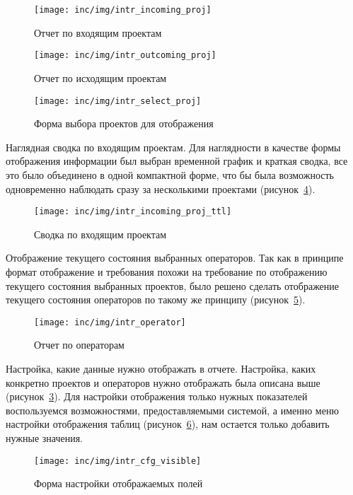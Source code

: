 \begin{figure}[ht]
    \centering
    \texttt{[image: inc/img/intr\_incoming\_proj]}
    \caption{Отчет по входящим проектам}
    \label{pic:intr:proj:incoming}
\end{figure}

\begin{figure}[ht]
    \centering
    \texttt{[image: inc/img/intr\_outcoming\_proj]}
    \caption{Отчет по исходящим проектам}
    \label{pic:intr:proj:outcoming}
\end{figure}

\begin{figure}[ht]
    \centering
    \texttt{[image: inc/img/intr\_select\_proj]}
    \caption{Форма выбора проектов для отображения}
    \label{pic:intr:proj:select}
\end{figure}

Наглядная сводка по входящим проектам.
Для наглядности в качестве формы отображения информации был выбран временной
график и краткая сводка,
все это было объединено в одной компактной форме,
что бы была возможность одновременно наблюдать сразу за несколькими проектами
(рисунок~\ref{pic:intr:proj:incoming:total}).

\begin{figure}[ht]
    \centering
    \texttt{[image: inc/img/intr\_incoming\_proj\_ttl]}
    \caption{Сводка по входящим проектам}
    \label{pic:intr:proj:incoming:total}
\end{figure}

Отображение текущего состояния выбранных операторов.
Так как в принципе формат отображение и требования похожи
на требование по отображению текущего состояния выбранных проектов,
было решено сделать отображение текущего состояния операторов по такому
же принципу (рисунок~\ref{pic:intr:operator}).

\begin{figure}[ht]
    \centering
    \texttt{[image: inc/img/intr\_operator]}
    \caption{Отчет по операторам}
    \label{pic:intr:operator}
\end{figure}

Настройка, какие данные нужно отображать в отчете.
Настройка, каких конкретно проектов и операторов нужно отображать
была описана выше (рисунок~\ref{pic:intr:proj:select}).
Для настройки отображения только нужных показателей воспользуемся возможностями,
предоставляемыми системой,
а именно меню настройки отображения таблиц (рисунок~\ref{pic:intr:cfg:visible}),
нам остается только добавить нужные значения.

\begin{figure}[ht]
    \centering
    \texttt{[image: inc/img/intr\_cfg\_visible]}
    \caption{Форма настройки отображаемых полей}
    \label{pic:intr:cfg:visible}
\end{figure}